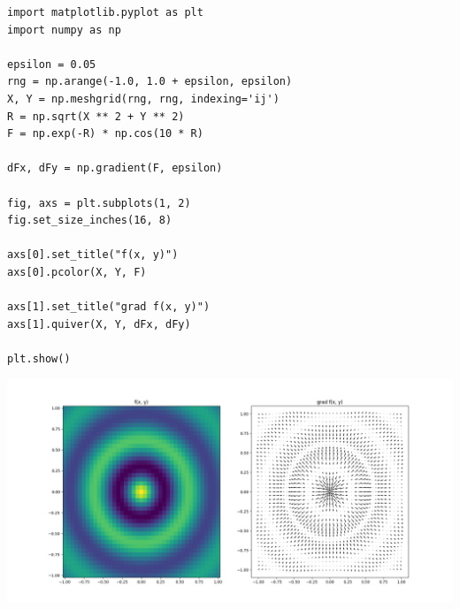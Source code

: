 
\begin{frame}[fragile]
%
\begin{codebox}
\begin{verbatim}
import matplotlib.pyplot as plt
import numpy as np

epsilon = 0.05
rng = np.arange(-1.0, 1.0 + epsilon, epsilon)
X, Y = np.meshgrid(rng, rng, indexing='ij')
R = np.sqrt(X ** 2 + Y ** 2)
F = np.exp(-R) * np.cos(10 * R)

dFx, dFy = np.gradient(F, epsilon)

fig, axs = plt.subplots(1, 2)
fig.set_size_inches(16, 8)

axs[0].set_title("f(x, y)")
axs[0].pcolor(X, Y, F)

axs[1].set_title("grad f(x, y)")
axs[1].quiver(X, Y, dFx, dFy)

plt.show()
\end{verbatim}
\end{codebox}
%
\end{frame}


\begin{frame}
%
\begin{defbox}
\includegraphics[width=\linewidth]{./gfx/03-derivatives-numpy}
\end{defbox}
%
\end{frame}



